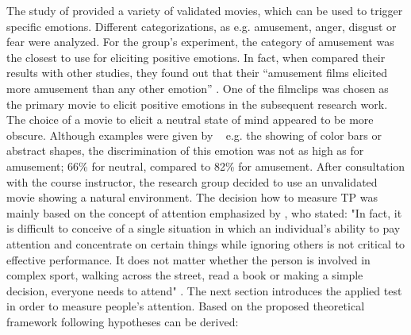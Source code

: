 \documentclass[	
	12pt, %
	a4paper, %
  abstracton
]{scrartcl}\usepackage[]{graphicx}\usepackage[]{color}
\begin{document}
The study of  provided a variety of validated movies, which can be used to trigger specific emotions. Different categorizations, as e.g. amusement, anger, disgust or fear were analyzed. For the group’s experiment, the category of amusement was the closest to use for eliciting positive emotions. In fact, when  compared their results with other studies, they found out that their “amusement films elicited more amusement than any other emotion” \cite[p. 101]{Gross1995}. One of the filmclips was chosen as the primary movie to elicit positive emotions in the subsequent research work. The choice of a movie to elicit a neutral state of mind appeared to be more obscure. Although examples were given by ~ e.g. the showing of color bars or abstract shapes, the discrimination of this emotion was not as high as for amusement; 66\% for neutral, compared to 82\% for amusement. After consultation with the course instructor, the research group decided to use an unvalidated movie showing a natural environment. The decision how to measure TP was mainly based on the concept of attention emphasized by , who stated: "In fact, it is difficult to conceive of a single situation in which an individual's ability to pay attention and concentrate on certain things while ignoring others is not critical to effective performance. It does not matter whether the person is involved in complex sport, walking across the street, read a book or making a simple decision, everyone needs to attend" \cite[p. 26]{Nideffer1981}. The next section introduces the applied test in order to measure people's attention. Based on the proposed theoretical framework following hypotheses can be derived:
\end{document}

